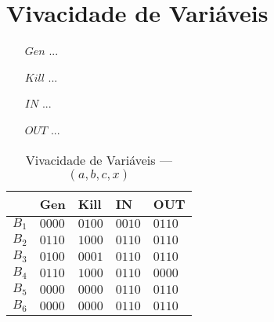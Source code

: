 \section{Vivacidade de Vari\'aveis}

\begin{itemize}
  \item[$Gen$] ...
  \item[$Kill$] ...
  \item[$IN$] ...
  \item[$OUT$] ...
\end{itemize}



\begin{table}[ht]
\centering
\begin{tabular}{l|l|l|l|l}
	& Gen & Kill & IN & OUT\\
\hline
$B_{1}$ &  $0000$ & $0100$ & $0010$ & $0110$\\
$B_{2}$ &  $0110$ & $1000$ & $0110$ & $0110$\\
$B_{3}$ &  $0100$ & $0001$ & $0110$ & $0110$\\
$B_{4}$ &  $0110$ & $1000$ & $0110$ & $0000$\\
$B_{5}$ &  $0000$ & $0000$ & $0110$ & $0110$\\
$B_{6}$ &  $0000$ & $0000$ & $0110$ & $0110$\\
\end{tabular}
\caption{Vivacidade de Vari\'aveis --- $(a, b, c, x)$}
\end{table}


